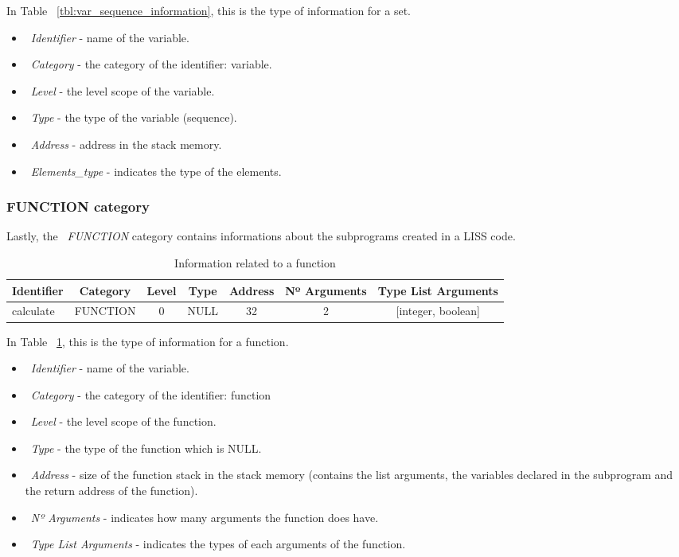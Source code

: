 \documentclass[
  oneside,
  11pt, a4paper,
  footinclude=true,
  headinclude=true,
  cleardoublepage=empty
]{scrbook}
\begin{document}
In Table ~\ref{tbl:var_sequence_information}, this is the type of information for a set.
\begin{itemize}
\item ~\textit{Identifier} - name of the variable.
\item ~\textit{Category} - the category of the identifier: variable.
\item ~\textit{Level} - the level scope of the variable.
\item ~\textit{Type} - the type of the variable (sequence).
\item ~\textit{Address} - address in the stack memory.
\item ~\textit{Elements\_type} - indicates the type of the elements.
\end{itemize}

\subsubsection{FUNCTION category}

Lastly, the ~\textit{FUNCTION} category contains informations about the subprograms created in a LISS code.

\begin{table}[h!]
\centering
\caption{Information related to a function}
\label{tbl:function_information}
\begin{tabular}{l|c|c|c|c|c|c}
\multicolumn{1}{c|}{Identifier} & Category & Level & Type & Address & Nº Arguments & Type List Arguments    \\ \hline
calculate                       & FUNCTION & 0     & NULL & 32      & 2            & {[}integer, boolean{]}
\end{tabular}
\end{table}

In Table ~\ref{tbl:function_information}, this is the type of information for a function.
\begin{itemize}
\item ~\textit{Identifier} - name of the variable.
\item ~\textit{Category} - the category of the identifier: function
\item ~\textit{Level} - the level scope of the function.
\item ~\textit{Type} - the type of the function which is NULL.
\item ~\textit{Address} - size of the function stack in the stack memory (contains the list arguments, the variables declared in the subprogram and the return address of the function).
\item ~\textit{Nº Arguments} - indicates how many arguments the function does have.
\item ~\textit{Type List Arguments} - indicates the types of each arguments of the function.
\end{itemize}
\end{document}
